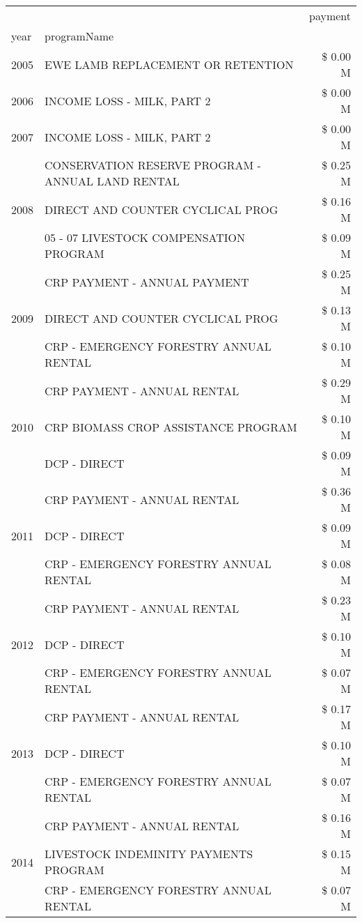 \begin{tabular}{llr}
\toprule
 &  & payment \\
year & programName &  \\
\midrule
2005 & EWE LAMB REPLACEMENT OR RETENTION & \$ 0.00 M \\
\cline{1-3}
2006 & INCOME LOSS - MILK, PART 2 & \$ 0.00 M \\
\cline{1-3}
2007 & INCOME LOSS - MILK, PART 2 & \$ 0.00 M \\
\cline{1-3}
\multirow[t]{3}{*}{2008} & CONSERVATION RESERVE PROGRAM - ANNUAL LAND RENTAL & \$ 0.25 M \\
 & DIRECT AND COUNTER CYCLICAL PROG & \$ 0.16 M \\
 & 05 - 07 LIVESTOCK COMPENSATION PROGRAM & \$ 0.09 M \\
\cline{1-3}
\multirow[t]{3}{*}{2009} & CRP PAYMENT - ANNUAL PAYMENT & \$ 0.25 M \\
 & DIRECT AND COUNTER CYCLICAL PROG & \$ 0.13 M \\
 & CRP - EMERGENCY FORESTRY ANNUAL RENTAL & \$ 0.10 M \\
\cline{1-3}
\multirow[t]{3}{*}{2010} & CRP PAYMENT - ANNUAL RENTAL & \$ 0.29 M \\
 & CRP BIOMASS CROP ASSISTANCE PROGRAM & \$ 0.10 M \\
 & DCP - DIRECT & \$ 0.09 M \\
\cline{1-3}
\multirow[t]{3}{*}{2011} & CRP PAYMENT - ANNUAL RENTAL & \$ 0.36 M \\
 & DCP - DIRECT & \$ 0.09 M \\
 & CRP - EMERGENCY FORESTRY ANNUAL RENTAL & \$ 0.08 M \\
\cline{1-3}
\multirow[t]{3}{*}{2012} & CRP PAYMENT - ANNUAL RENTAL & \$ 0.23 M \\
 & DCP - DIRECT & \$ 0.10 M \\
 & CRP - EMERGENCY FORESTRY ANNUAL RENTAL & \$ 0.07 M \\
\cline{1-3}
\multirow[t]{3}{*}{2013} & CRP PAYMENT - ANNUAL RENTAL & \$ 0.17 M \\
 & DCP - DIRECT & \$ 0.10 M \\
 & CRP - EMERGENCY FORESTRY ANNUAL RENTAL & \$ 0.07 M \\
\cline{1-3}
\multirow[t]{3}{*}{2014} & CRP PAYMENT - ANNUAL RENTAL & \$ 0.16 M \\
 & LIVESTOCK INDEMINITY PAYMENTS PROGRAM & \$ 0.15 M \\
 & CRP - EMERGENCY FORESTRY ANNUAL RENTAL & \$ 0.07 M \\

\end{tabular}
